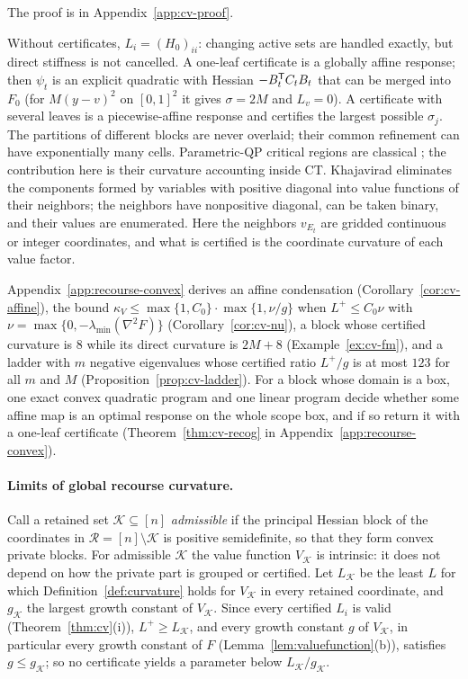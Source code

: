 The proof is in Appendix~\ref{app:cv-proof}.

\begin{remark}\label{rem:cv-instances}
Without certificates, $L_i=(H_0)_{ii}$: changing active sets are handled
exactly, but direct stiffness is not cancelled. A one-leaf certificate is a
globally affine response; then $\psi_t$ is an explicit quadratic with
Hessian $-B_t^{\mathsf T}C_tB_t$ that can be merged into $F_0$ (for $M(y-v)^2$ on
$[0,1]^2$ it gives $\sigma=2M$ and $L_v=0$). A certificate with several
leaves is a piecewise-affine response and certifies the largest possible
$\sigma_j$. The partitions of different blocks are never overlaid; their
common refinement can have exponentially many cells. Parametric-QP critical
regions are classical \cite{BemporadEtAl2002}; the contribution here is
their curvature accounting inside CT. Khajavirad \cite{Khajavirad2026PolyBox}
eliminates the components formed by variables with positive diagonal into
value functions of their neighbors; the neighbors have nonpositive diagonal,
can be taken binary, and their values are enumerated. Here the neighbors
$v_{E_t}$ are gridded continuous or integer coordinates, and what is
certified is the coordinate curvature of each value factor.
\end{remark}

Appendix~\ref{app:recourse-convex} derives an affine condensation
(Corollary~\ref{cor:cv-affine}), the bound
$\kappa_V\le\max\{1,C_0\}\cdot\max\{1,\nu/g\}$ when $L^+\le C_0\nu$ with
$\nu=\max\{0,-\lambda_{\min}(\nabla^2F)\}$ (Corollary~\ref{cor:cv-nu}), a
block whose certified curvature is $8$ while its direct curvature is $2M+8$
(Example~\ref{ex:cv-fm}), and a ladder with $m$ negative eigenvalues whose
certified ratio $L^+/g$ is at most $123$ for all $m$ and $M$
(Proposition~\ref{prop:cv-ladder}). For a block whose domain is a box, one
exact convex quadratic program and one linear program decide whether some
affine map is an optimal response on the whole scope box, and if so return
it with a one-leaf certificate (Theorem~\ref{thm:cv-recog} in
Appendix~\ref{app:recourse-convex}).

\paragraph{Limits of global recourse curvature.}
Call a retained set $\mathcal K\subseteq[n]$ \emph{admissible} if the
principal Hessian block of the coordinates in $\mathcal R=[n]\setminus\mathcal K$
is positive semidefinite, so that they form convex private blocks. For
admissible $\mathcal K$ the value function $V_{\mathcal K}$ is intrinsic: it
does not depend on how the private part is grouped or certified. Let
$L_{\mathcal K}$ be the least $L$ for which Definition~\ref{def:curvature}
holds for $V_{\mathcal K}$ in every retained coordinate, and
$g_{\mathcal K}$ the largest growth constant of $V_{\mathcal K}$. Since every
certified $L_i$ is valid (Theorem~\ref{thm:cv}(i)), $L^+\ge L_{\mathcal K}$,
and every growth constant $g$ of $V_{\mathcal K}$, in particular every growth
constant of $F$ (Lemma~\ref{lem:valuefunction}(b)), satisfies
$g\le g_{\mathcal K}$; so no certificate yields a parameter below
$L_{\mathcal K}/g_{\mathcal K}$.

